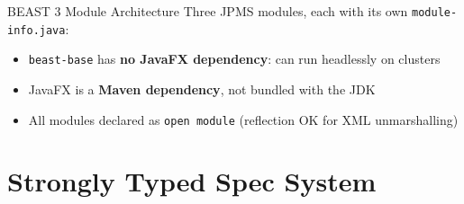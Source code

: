 \documentclass[aspectratio=169,11pt]{beamer}
\newcommand{\code}[1]{\texttt{#1}}
\begin{document}

\begin{frame}{BEAST 3 Module Architecture}
Three JPMS modules, each with its own \code{module-info.java}:

\vspace{1em}
\begin{center}
\end{center}

\vspace{1em}
\begin{itemize}
\item \code{beast-base} has \textbf{no JavaFX dependency}: can run headlessly on clusters
\item JavaFX is a \textbf{Maven dependency}, not bundled with the JDK
\item All modules declared as \code{open module} (reflection OK for XML unmarshalling)
\end{itemize}
\end{frame}

\section{Strongly Typed Spec System}

\end{document}
